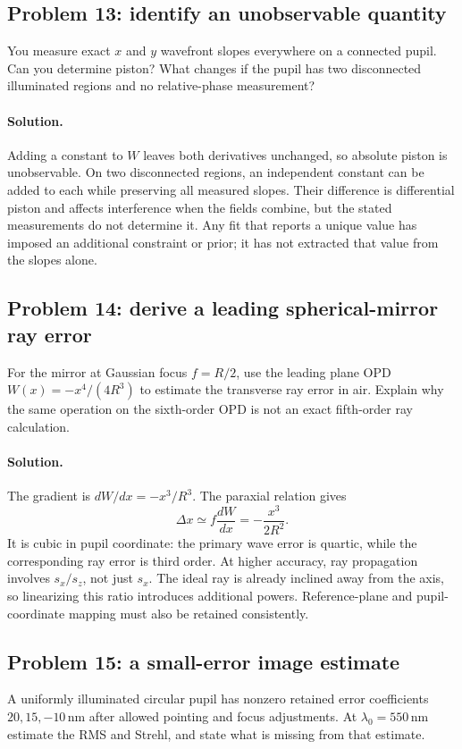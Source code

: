 \subsection*{Problem 13: identify an unobservable quantity}
You measure exact $x$ and $y$ wavefront slopes everywhere on a connected
pupil. Can you determine piston? What changes if the pupil has two
disconnected illuminated regions and no relative-phase measurement?

\paragraph{Solution.}
Adding a constant to $W$ leaves both derivatives unchanged, so absolute
piston is unobservable. On two disconnected regions, an independent
constant can be added to each while preserving all measured slopes.
Their difference is differential piston and affects interference when
the fields combine, but the stated measurements do not determine it.
Any fit that reports a unique value has imposed an additional constraint
or prior; it has not extracted that value from the slopes alone.

\subsection*{Problem 14: derive a leading spherical-mirror ray error}
For the mirror at Gaussian focus $f=R/2$, use the leading plane OPD
$W(x)=-x^4/(4R^3)$ to estimate the transverse ray error in air.
Explain why the same operation on the sixth-order OPD is not an exact
fifth-order ray calculation.

\paragraph{Solution.}
The gradient is $dW/dx=-x^3/R^3$. The paraxial relation gives
\begin{equation}
 \Delta x\simeq f\frac{dW}{dx}=-\frac{x^3}{2R^2}.
\end{equation}
It is cubic in pupil coordinate: the primary wave error is quartic,
while the corresponding ray error is third order. At higher accuracy,
ray propagation involves $s_x/s_z$, not just $s_x$. The ideal ray
is already inclined away from the axis, so linearizing this ratio
introduces additional powers. Reference-plane and pupil-coordinate
mapping must also be retained consistently.

\subsection*{Problem 15: a small-error image estimate}
A uniformly illuminated circular pupil has nonzero retained error
coefficients $20,15,-10\,\mathrm{nm}$ after allowed pointing and
focus adjustments. At $\lambda_0=550\,\mathrm{nm}$ estimate the
RMS and Strehl, and state what is missing from that estimate.

